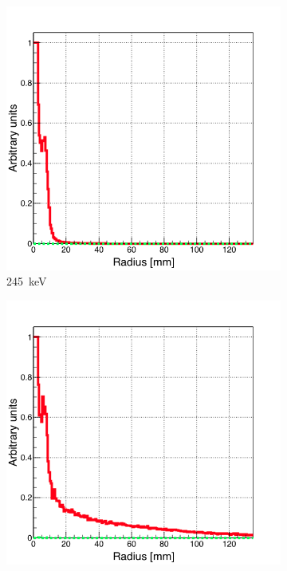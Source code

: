 \begin{figure}
\begin{subfigure}{.5\textwidth}
  \centering
  \includegraphics[width=.9\linewidth]{03_GraphicFiles/chapter5_SPECTsimu/SPECT/anger/no_holes/overlap_infAbs_245keV_normMax}
  \caption{245~keV}
  \label{chap5::fig::rad_distr_fullAbs_245keV}
\end{subfigure}
\begin{subfigure}{.5\textwidth}
  \centering
  \includegraphics[width=.9\linewidth]{03_GraphicFiles/chapter5_SPECTsimu/SPECT/anger/no_holes/overlap_infAbs_555keV_normMax}

\end{subfigure}
\end{figure}

